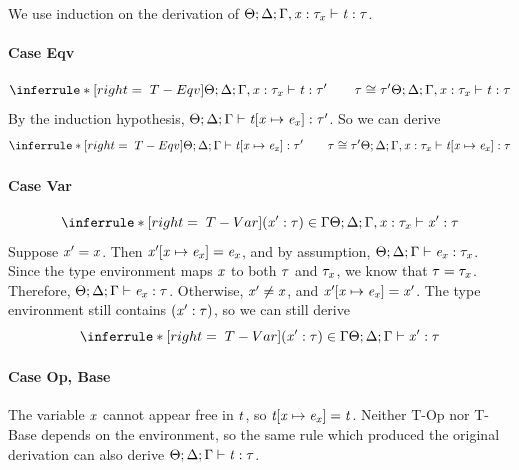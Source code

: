 \begin{sproof}
  We use induction on the derivation of
  $\Theta;\Delta;\Gamma,\mathit{x} : \mathit{\tau}_{\mathit{x}} \vdash \mathit{t} : \mathit{\tau}$.
  \paragraph{Case {\sc Eqv}}
  \[{\infr[T-Eqv]
    {\typeof{\sEnv}{\kEnv}{\tEnv, \hastype{\var}{\type_{\var}}}{\term}{\type'}
      \qquad \teqv{\type}{\type'}}
    {\typeof{\sEnv}{\kEnv}{\tEnv, \hastype{\var}{\type_{\var}}}
      {\term}
      {\type}}}\]
  By the induction hypothesis,
  $\Theta;\Delta;\Gamma \vdash \mathit{t}\hspace{-2pt}\left[ \mathit{x} \mapsto \mathit{e}_{\mathit{x}} \right] : \mathit{\tau}'$.
  So we can derive
  \[{\infr[T-Eqv]
    {\typeof{\sEnv}{\kEnv}{\tEnv}{\exprsubst{\term}}{\type'}
      \qquad \teqv{\type}{\type'}}
    {\typeof{\sEnv}{\kEnv}{\tEnv, \hastype{\var}{\type_{\var}}}
      {\exprsubst{\term}}
      {\type}}}\]
  \paragraph{Case {\sc Var}}
  \[{\infr[T-Var]
    {\parens{\hastype{\var'}{\type}} \in \tEnv}
    {\typeof{\sEnv}{\kEnv}{\tEnv, \hastype{\var}{\type_{\var}}}
      {\var'}
      {\type}}}\]
  Suppose $\mathit{x}' = \mathit{x}$.
  Then $\mathit{x}'\hspace{-2pt}\left[ \mathit{x} \mapsto \mathit{e}_{\mathit{x}} \right] = \mathit{e}_{\mathit{x}}$,
  and by assumption, $\Theta;\Delta;\Gamma \vdash \mathit{e}_{\mathit{x}} : \mathit{\tau}_{\mathit{x}}$.
  Since the type environment maps $\mathit{x}$ to both $\mathit{\tau}$ and $\mathit{\tau}_{\mathit{x}}$,
  we know that $\mathit{\tau} = \mathit{\tau}_{\mathit{x}}$.
  Therefore, $\Theta;\Delta;\Gamma \vdash \mathit{e}_{\mathit{x}} : \mathit{\tau}$.
  Otherwise, $\mathit{x}' \not= \mathit{x}$, and $\mathit{x}'\hspace{-2pt}\left[ \mathit{x} \mapsto \mathit{e}_{\mathit{x}} \right] = \mathit{x}'$.
  The type environment still contains $\left( \mathit{x}' : \mathit{\tau} \right)$,
  so we can still derive
  \[{\infr[T-Var]
    {\parens{\hastype{\var'}{\type}} \in \tEnv}
    {\typeof{\sEnv}{\kEnv}{\tEnv}{\var'}{\type}}}\]
  \paragraph{Case {\sc Op}, {\sc Base}}
  The variable $\mathit{x}$ cannot appear free in $\mathit{t}$, so $\mathit{t}\hspace{-2pt}\left[ \mathit{x} \mapsto \mathit{e}_{\mathit{x}} \right] = \mathit{t}$.
  Neither {\sc T-Op} nor {\sc T-Base} depends on the environment,
  so the same rule which produced the original derivation
  can also derive $\Theta;\Delta;\Gamma \vdash \mathit{t} : \mathit{\tau}$.

\end{sproof}

